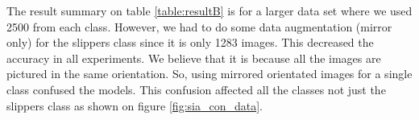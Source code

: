 The result summary on table \ref{table:resultB} is for a larger data set where we used 2500 from each class. However, we had to do some data augmentation (mirror only) for the slippers class since it is only 1283 images. This decreased the accuracy in all experiments. We believe that it is because all the images are pictured in the same orientation. So, using mirrored orientated images for a single class confused the models. This confusion affected all the classes not just the slippers class as shown on figure \ref{fig:sia_con_data}.





 
